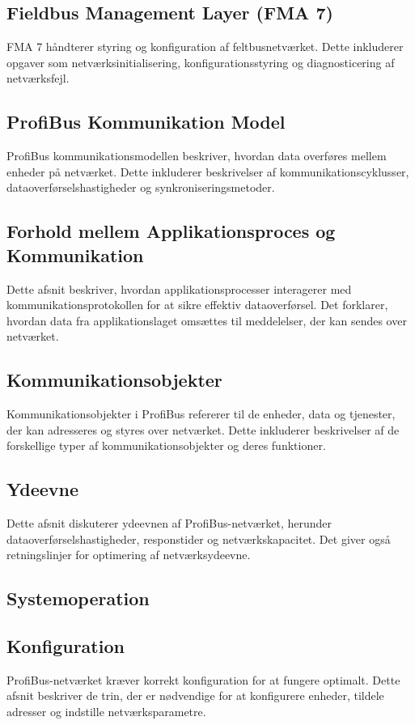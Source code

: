 \subsection*{Fieldbus Management Layer (FMA 7)}
FMA 7 håndterer styring og konfiguration af feltbusnetværket. Dette inkluderer opgaver som netværksinitialisering, konfigurationsstyring og diagnosticering af netværksfejl.

\subsection{ProfiBus Kommunikation Model}
ProfiBus kommunikationsmodellen beskriver, hvordan data overføres mellem enheder på netværket. Dette inkluderer beskrivelser af kommunikationscyklusser, dataoverførselshastigheder og synkroniseringsmetoder.

\subsection{Forhold mellem Applikationsproces og Kommunikation}
Dette afsnit beskriver, hvordan applikationsprocesser interagerer med kommunikationsprotokollen for at sikre effektiv dataoverførsel. Det forklarer, hvordan data fra applikationslaget omsættes til meddelelser, der kan sendes over netværket.

\subsection{Kommunikationsobjekter}
Kommunikationsobjekter i ProfiBus refererer til de enheder, data og tjenester, der kan adresseres og styres over netværket. Dette inkluderer beskrivelser af de forskellige typer af kommunikationsobjekter og deres funktioner.

\subsection{Ydeevne}
Dette afsnit diskuterer ydeevnen af ProfiBus-netværket, herunder dataoverførselshastigheder, responstider og netværkskapacitet. Det giver også retningslinjer for optimering af netværksydeevne.

\subsection{Systemoperation}
\subsection*{Konfiguration}
ProfiBus-netværket kræver korrekt konfiguration for at fungere optimalt. Dette afsnit beskriver de trin, der er nødvendige for at konfigurere enheder, tildele adresser og indstille netværksparametre.

